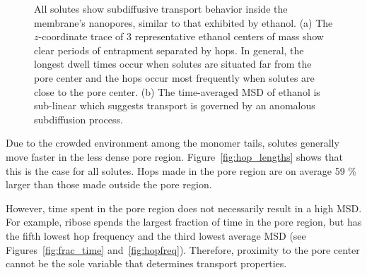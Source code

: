 \documentclass{article}
\begin{document}
\begin{figure}
\begin{subfigure}{0.49\linewidth}
  \caption{}\label{fig:example_msd}
  \end{subfigure}
  \caption{All solutes show subdiffusive transport behavior inside the membrane's
  nanopores, similar to that exhibited by ethanol. (a) The $z$-coordinate trace of
  3 representative ethanol centers of mass show clear periods of entrapment separated by hops.
  In general, the longest dwell times occur when solutes are situated far from the
  pore center and the hops occur most frequently when solutes are close to the pore center. (b) The
  time-averaged MSD of ethanol is sub-linear which suggests transport is governed
  by an anomalous subdiffusion process.}\label{fig:qualitative_mechanisms}

  \end{figure}
  
  Due to the crowded environment among the monomer tails, solutes generally move
  faster in the less dense pore region. Figure~\ref{fig:hop_lengths} shows that 
  this is the case for all solutes. Hops made in the pore region are on average
  59 \% larger than those made outside the pore region.
  
  However, time spent in the pore region does not necessarily result
  in a high MSD. For example, ribose spends the largest fraction of time in 
  the pore region, but has the fifth lowest hop frequency and the third 
  lowest average MSD (see Figures~\ref{fig:frac_time} and~\ref{fig:hopfreq}).
  Therefore, proximity to the pore center cannot be the sole variable that
  determines transport properties.
  
\end{document}

